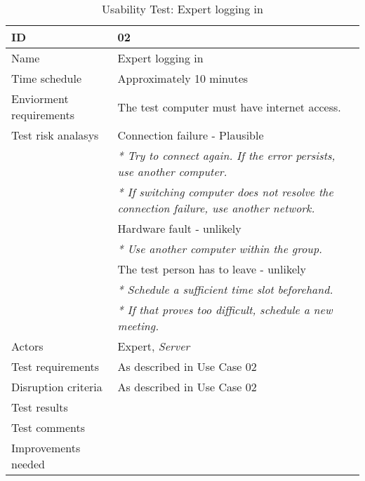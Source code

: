 {\footnotesize
\begin{table}[H]
\begin{tabular}{| p{5cm} | p{10cm} |}\hline
	\textbf{ID}	& \textbf{02} \\ \hline
	Name		& Expert logging in\\ \hline
	Time schedule	& Approximately 10 minutes\\ \hline
	Enviorment requirements 
		& The test computer must have internet access. \\ \hline
	Test risk analasys 
		& Connection failure - Plausible \\
		& \emph{* Try to connect again. If the error persists, use another computer.} \\
		& \emph{* If switching computer does not resolve the connection failure, use another network.}\\
		& Hardware fault - unlikely \\
		& \emph{* Use another computer within the group.} \\
		& The test person has to leave - unlikely \\
		& \emph{* Schedule a sufficient time slot beforehand.} \\
		& \emph{* If that proves too difficult, schedule a new meeting.}\\ \hline
	Actors	& Expert, \emph{Server}\\ \hline
	Test requirements & As described in Use Case 02 \\ \hline
	Disruption criteria & As described in Use Case 02  \\ \hline
	Test results 
		& \\ \hline
	Test comments
		& \\ \hline
	Improvements needed
		& \\ \hline
\end{tabular}


\caption{Usability Test: Expert logging in}
\label{fig:usability_test_2}
\end{table}}


